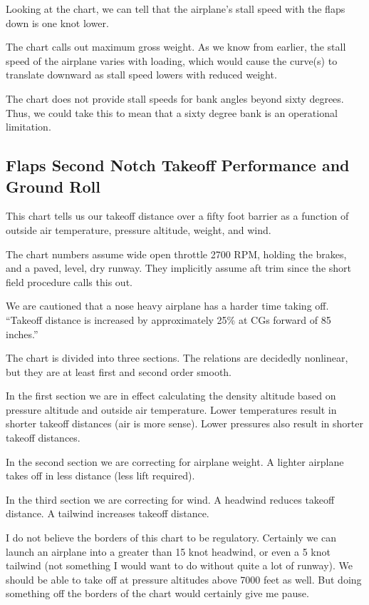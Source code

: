 Looking at the chart, we can tell that the airplane's stall speed with the flaps down is one knot lower.

The chart calls out maximum gross weight. As we know from earlier, the stall speed of the airplane varies with loading, which would cause the curve(s) to translate downward as stall speed lowers with reduced weight.

The chart does not provide stall speeds for bank angles beyond sixty degrees. Thus, we could take this to mean that a sixty degree bank is an operational limitation.

\subsection{Flaps Second Notch Takeoff Performance and Ground Roll}

This chart tells us our takeoff distance over a fifty foot barrier as a function of outside air temperature, pressure altitude, weight, and wind.

The chart numbers assume wide open throttle 2700 RPM, holding the brakes, and a paved, level, dry runway. They implicitly assume aft trim since the short field procedure calls this out.

We are cautioned that a nose heavy airplane has a harder time taking off. ``Takeoff distance is increased by approximately 25\% at CGs forward of 85 inches.'' 

The chart is divided into three sections. The relations are decidedly nonlinear, but they are at least first and second order smooth.

In the first section we are in effect calculating the density altitude based on pressure altitude and outside air temperature. Lower temperatures result in shorter takeoff distances (air is more sense). Lower pressures also result in shorter takeoff distances.

In the second section we are correcting for airplane weight. A lighter airplane takes off in less distance (less lift required).

In the third section we are correcting for wind. A headwind reduces takeoff distance. A tailwind increases takeoff distance.

I do not believe the borders of this chart to be regulatory. Certainly we can launch an airplane into a greater than 15 knot headwind, or even a 5 knot tailwind (not something I would want to do without quite a lot of runway). We should be able to take off at pressure altitudes above 7000 feet as well. But doing something off the borders of the chart would certainly give me pause.

